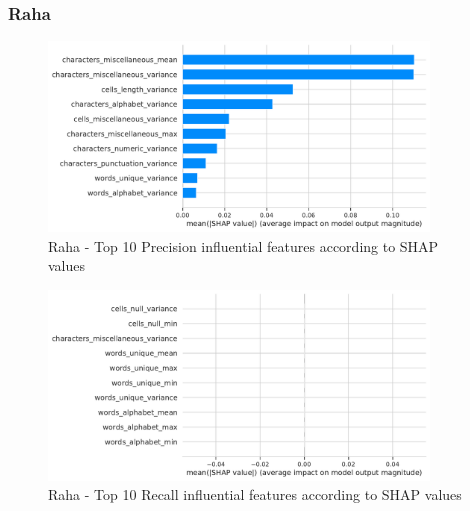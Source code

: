 \subsubsection{Raha}
\begin{figure}[H]
    \centering
    \includegraphics[width=0.9\textwidth]{thesis/Figures/RQ4/Shap_cell_prec_Raha.pdf}
    \caption{Raha - Top 10 Precision influential features according to SHAP values}
    \label{fig:feature_importance_prec_Raha}
\end{figure}
\begin{figure}[H]
    \centering
    \includegraphics[width=0.9\textwidth]{thesis/Figures/RQ4/Shap_cell_rec_Raha.pdf}
    \caption{Raha - Top 10 Recall influential features according to SHAP values}
    \label{fig:feature_importance_rec_Raha}
\end{figure}

